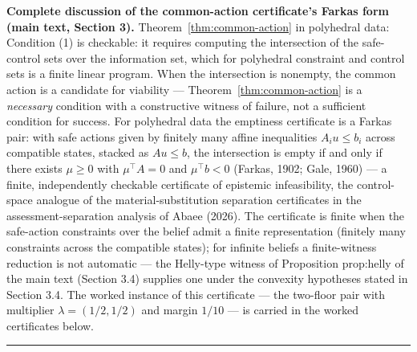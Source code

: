 \documentclass[11pt]{article}
\theoremstyle{definition}
\begin{document}
\bigskip
\noindent\textbf{Complete discussion of the common-action certificate's Farkas form (main text, Section 3).}
Theorem~\ref{thm:common-action} in polyhedral data:
Condition (1) is checkable: it requires computing the intersection of
the safe-control sets over the information set, which for polyhedral
constraint and control sets is a finite linear program. When the
intersection is nonempty, the common action is a candidate for viability
--- Theorem~\ref{thm:common-action} is a \emph{necessary} condition with a constructive
witness of failure, not a sufficient condition for success. For
polyhedral data the emptiness certificate is a Farkas pair: with safe
actions given by finitely many affine inequalities \(A_i u \le b_i\)
across compatible states, stacked as \(A u \le b\), the intersection is
empty if and only if there exists \(\mu \ge 0\) with \(\mu^{\top} A = 0\) and \(\mu^{\top} b < 0\) (Farkas, 1902;
Gale, 1960) --- a finite, independently checkable certificate of
epistemic infeasibility, the control-space analogue of the material-substitution separation certificates in the assessment-separation analysis of Abaee (2026). The certificate
is finite when the safe-action constraints over the belief admit a finite
representation (finitely many constraints across the compatible states);
for infinite beliefs a finite-witness reduction is not automatic --- the Helly-type witness of Proposition prop:helly of the main text (Section 3.4) supplies one under the convexity hypotheses stated in Section 3.4. The worked instance of this certificate --- the two-floor pair with multiplier \(\lambda = (1/2, 1/2)\) and margin \(1/10\) --- is carried in the worked certificates below.
\rule{0.5\linewidth}{0.5pt}
\end{document}
